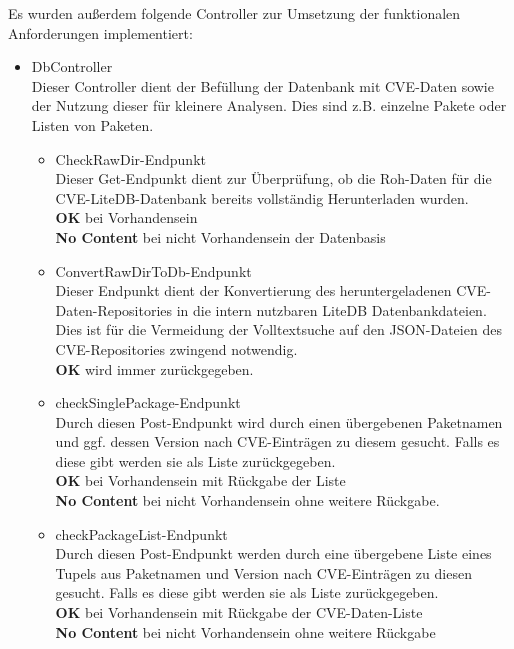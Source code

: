     Es wurden außerdem folgende Controller zur Umsetzung der funktionalen Anforderungen implementiert:
    \begin{itemize}
        \item DbController \label{api_controller:three}\\
            Dieser Controller dient der Befüllung der Datenbank mit \ac{CVE}-Daten sowie der Nutzung dieser für kleinere Analysen. Dies sind z.B. einzelne Pakete oder Listen von Paketen.
            \begin{itemize}
                \item CheckRawDir-Endpunkt \\
                    Dieser Get-Endpunkt dient zur Überprüfung, ob die Roh-Daten für die \ac{CVE}-LiteDB-Datenbank bereits vollständig Herunterladen wurden.
                    \\
                    \textbf{OK} bei Vorhandensein
                    \\
                    \textbf{No Content} bei nicht Vorhandensein der Datenbasis
                \item ConvertRawDirToDb-Endpunkt \\
                    Dieser Endpunkt dient der Konvertierung des heruntergeladenen \ac{CVE}-Daten-Repositories in die intern nutzbaren LiteDB Datenbankdateien.
                    Dies ist für die Vermeidung der Volltextsuche auf den \ac{JSON}-Dateien des \ac{CVE}-Repositories zwingend notwendig.
                    \\
                    \textbf{OK} wird immer zurückgegeben.
                \item checkSinglePackage-Endpunkt \\
                    Durch diesen Post-Endpunkt wird durch einen übergebenen Paketnamen und ggf. dessen Version nach \ac{CVE}-Einträgen zu diesem gesucht.
                    Falls es diese gibt werden sie als Liste zurückgegeben.
                    \\
                    \textbf{OK} bei Vorhandensein mit Rückgabe der Liste
                    \\
                    \textbf{No Content} bei nicht Vorhandensein ohne weitere Rückgabe.
                \item checkPackageList-Endpunkt \\
                    Durch diesen Post-Endpunkt werden durch eine übergebene Liste eines Tupels aus Paketnamen und Version nach \ac{CVE}-Einträgen zu diesen gesucht.
                    Falls es diese gibt werden sie als Liste zurückgegeben.
                    \\
                    \textbf{OK} bei Vorhandensein mit Rückgabe der \ac{CVE}-Daten-Liste
                    \\
                    \textbf{No Content} bei nicht Vorhandensein ohne weitere Rückgabe
            \end{itemize}


\end{itemize}
